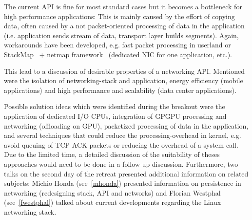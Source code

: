 The current API is fine for most standard cases but it becomes a bottleneck
for high performance applications: This is mainly caused by the effort of
copying data, often caused by a not packet-oriented processing of data in the
application (i.e. application sends stream of data, transport layer builds
segments).  Again, workarounds have been developed, e.g. fast packet
processing in userland or StackMap~\cite{mhonda:usenix:2016} + netmap
framework~\cite{lrizzo:usenix:2012} (dedicated NIC for one application, etc.).

This lead to a discussion of desirable properties of a networking API.
Mentioned were the isolation of networking-stack and application, energy
efficiency (mobile applications) and high performance and scalability (data
center applications).

Possible solution ideas which were identified during the breakout were the
application of dedicated I/O CPUs, integration of GPGPU processing and
networking (offloading on GPU), packetized processing of data in the
application, and several techniques that could reduce the processing-overhead
in kernel, e.g. avoid queuing of TCP ACK packets or reducing the overhead of a
system call. Due to the limited time, a detailed discussion of the suitability
of theses approaches would need to be done in a follow-up discussion.
Furthermore, two talks on the second day of the retreat presented additional
information on related subjects: Michio Honda (see~\autoref{mhonda}) presented
information on persistence in networking (redesigning stack, API and networks)
and Florian Westphal (see~\autoref{fwestphal}) talked about current
developments regarding the Linux networking stack.
